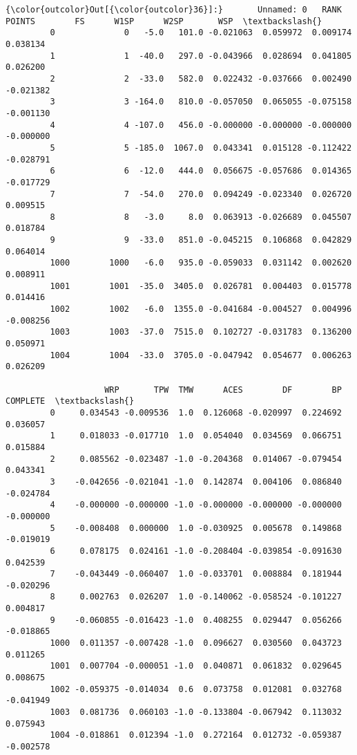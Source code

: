 \documentclass[11pt]{article}
\begin{document}
\begin{Verbatim}[commandchars=\\\{\}]
{\color{outcolor}Out[{\color{outcolor}36}]:}       Unnamed: 0   RANK  POINTS        FS      W1SP      W2SP       WSP  \textbackslash{}
         0              0   -5.0   101.0 -0.021063  0.059972  0.009174  0.038134   
         1              1  -40.0   297.0 -0.043966  0.028694  0.041805  0.026200   
         2              2  -33.0   582.0  0.022432 -0.037666  0.002490 -0.021382   
         3              3 -164.0   810.0 -0.057050  0.065055 -0.075158 -0.001130   
         4              4 -107.0   456.0 -0.000000 -0.000000 -0.000000 -0.000000   
         5              5 -185.0  1067.0  0.043341  0.015128 -0.112422 -0.028791   
         6              6  -12.0   444.0  0.056675 -0.057686  0.014365 -0.017729   
         7              7  -54.0   270.0  0.094249 -0.023340  0.026720  0.009515   
         8              8   -3.0     8.0  0.063913 -0.026689  0.045507  0.018784   
         9              9  -33.0   851.0 -0.045215  0.106868  0.042829  0.064014   
         1000        1000   -6.0   935.0 -0.059033  0.031142  0.002620  0.008911   
         1001        1001  -35.0  3405.0  0.026781  0.004403  0.015778  0.014416   
         1002        1002   -6.0  1355.0 -0.041684 -0.004527  0.004996 -0.008256   
         1003        1003  -37.0  7515.0  0.102727 -0.031783  0.136200  0.050971   
         1004        1004  -33.0  3705.0 -0.047942  0.054677  0.006263  0.026209   
         
                    WRP       TPW  TMW      ACES        DF        BP  COMPLETE  \textbackslash{}
         0     0.034543 -0.009536  1.0  0.126068 -0.020997  0.224692  0.036057   
         1     0.018033 -0.017710  1.0  0.054040  0.034569  0.066751  0.015884   
         2     0.085562 -0.023487 -1.0 -0.204368  0.014067 -0.079454  0.043341   
         3    -0.042656 -0.021041 -1.0  0.142874  0.004106  0.086840 -0.024784   
         4    -0.000000 -0.000000 -1.0 -0.000000 -0.000000 -0.000000 -0.000000   
         5    -0.008408  0.000000  1.0 -0.030925  0.005678  0.149868 -0.019019   
         6     0.078175  0.024161 -1.0 -0.208404 -0.039854 -0.091630  0.042539   
         7    -0.043449 -0.060407  1.0 -0.033701  0.008884  0.181944 -0.020296   
         8     0.002763  0.026207  1.0 -0.140062 -0.058524 -0.101227  0.004817   
         9    -0.060855 -0.016423 -1.0  0.408255  0.029447  0.056266 -0.018865   
         1000  0.011357 -0.007428 -1.0  0.096627  0.030560  0.043723  0.011265   
         1001  0.007704 -0.000051 -1.0  0.040871  0.061832  0.029645  0.008675   
         1002 -0.059375 -0.014034  0.6  0.073758  0.012081  0.032768 -0.041949   
         1003  0.081736  0.060103 -1.0 -0.133804 -0.067942  0.113032  0.075943   
         1004 -0.018861  0.012394 -1.0  0.272164  0.012732 -0.059387 -0.002578   
         

\end{Verbatim}
\end{document}
